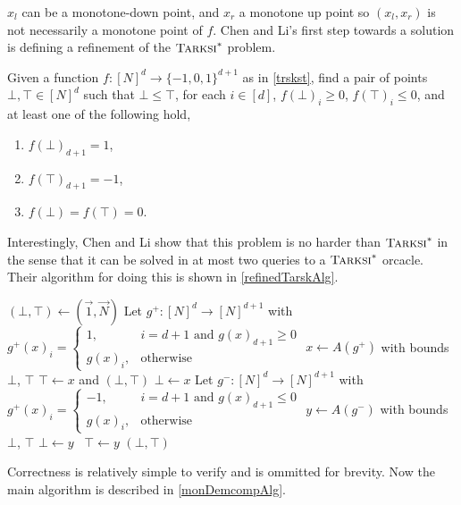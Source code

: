 $x_l$ can be a monotone-down point, and $x_r$ a monotone up point so $(x_l, x_r)$ is not necessarily
a monotone point of $f$. Chen and Li's first step towards a solution is defining a refinement of the
$\textsc{Tarksi}^*$ problem.
\begin{definition}
  Given a function $f : [N]^d \to \{-1, 0, 1\}^{d + 1}$ as in \cref{trskst}, find
  a pair of points $\bot, \top \in [N]^d$ such that $\bot \leq \top$, for each $i \in [d]$,
  $f(\bot)_i \geq 0$, $f(\top)_i \leq 0$, and at least one of the following hold,
  \begin{enumerate}
    \item $f(\bot)_{d + 1} = 1$,
    \item $f(\top)_{d + 1} = -1$,
    \item $f(\bot) = f(\top) = 0$.
  \end{enumerate}
\end{definition}
Interestingly, Chen and Li show that this problem is no harder than $\textsc{Tarksi}^*$ in the sense
that it can be solved in at most two queries to a $\textsc{Tarksi}^*$ orcacle. Their algorithm for doing this is
shown in \cref{refinedTarskAlg}.
\begin{algorithm}[h]
  \caption{\citep{chenLi}} \label{refinedTarskAlg}
  \begin{algorithmic}[1]
    \State $(\bot, \top) \gets (\vec{1}, \vec{N})$
    \State Let $g^+ : [N]^d \to [N]^{d+1}$ with $g^+(x)_i = 
      \begin{cases} 1, & i = d + 1 \text{ and } g(x)_{d + 1} \geq 0 \\ g(x)_i, & \text{otherwise}\end{cases}$
    \State $x \gets A(g^+)$ with bounds $\bot$, $\top$
    \State {} $\top \gets x$ and \Return $(\bot, \top)$ \EndIf
    \State $\bot \gets x$
  \State Let $g^- : [N]^d \to [N]^{d+1}$ with $g^+(x)_i = 
    \begin{cases} -1, & i = d + 1 \text{ and } g(x)_{d + 1} \leq 0 \\ g(x)_i, & \text{otherwise}\end{cases}$
  \State $y \gets A(g^-)$ with bounds $\bot$, $\top$
    \State {} $\bot \gets y$ \algorithmicelse\ $\top \gets y$ \EndIf
    \State \Return $(\bot, \top)$
  \EndProcedure
  \end{algorithmic}
\end{algorithm}
Correctness is relatively simple to verify and is ommitted for brevity.
Now the main algorithm is described in \cref{monDemcompAlg}.


